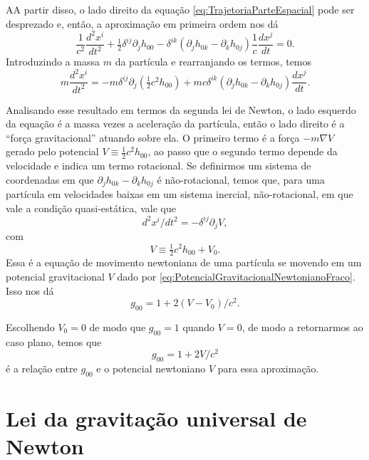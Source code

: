 AA partir disso, o lado direito da equação \eqref{eq:TrajetoriaParteEspacial} pode ser desprezado e, então, a aproximação em primeira ordem nos dá
\[
\frac{1}{c^{2}} \frac{d^{2} x^{i}}{d t^{2}}+\tfrac{1}{2} \delta^{i j} \partial_{j} h_{00}-\delta^{i k}\left(\partial_{j} h_{0 k}-\partial_{k} h_{0 j}\right) \frac{1}{c} \frac{d x^{j}}{d t}=0 .
\]
Introduzindo a massa $ m $ da partícula e rearranjando os termos, temos
\begin{equation}\label{eq:TrajetoriaParticulaComMassa}
m \frac{d^{2} x^{i}}{d t^{2}}=-m \delta^{i j} \partial_{j}\left(\tfrac{1}{2} c^{2} h_{00}\right)+m c \delta^{i k}\left(\partial_{j} h_{0 k}-\partial_{k} h_{0 j}\right) \frac{d x^{j}}{d t} .
\end{equation}

Analisando esse resultado em termos da segunda lei de Newton, o lado esquerdo da equação é a massa vezes a aceleração da partícula, então o lado direito é a ``força gravitacional'' atuando sobre ela. O primeiro termo é a força $ -m \nabla V $ gerado pelo potencial $ V \equiv \tfrac{1}{2} c^{2} h_{00} $, ao passo que o segundo termo depende da velocidade e indica um termo rotacional. Se definirmos um sistema de coordenadas em que $ \partial_{j} h_{0 k}-\partial_{k} h_{0 j} $ é não-rotacional, temos que, para uma partícula em velocidades baixas em um sistema inercial, não-rotacional, em que vale a condição quasi-estática, vale que
\begin{equation}\label{eq:EquacaoMovimentoPotencial}
d^{2} x^{i} / d t^{2}=-\delta^{i j} \partial_{j} V,
\end{equation}
com
\begin{equation}\label{eq:PotencialGravitacionalNewtonianoFraco}
V \equiv \tfrac{1}{2} c^{2} h_{00}+V_0.
\end{equation}
Essa é a equação de movimento newtoniana de uma partícula se movendo em um potencial gravitacional $ V $ dado por \eqref{eq:PotencialGravitacionalNewtonianoFraco}. Isso nos dá
\[
g_{00}=1+ 2(V-V_0) / c^{2}.
\]

Escolhendo $ V_0=0 $ de modo que $ g_{00} = 1 $ quando $ V=0 $, de modo a retornarmos ao caso plano, temos que
\begin{equation}\label{eq:RelacaoG00Potencial}
\boxed{
g_{00}=1+2 V / c^{2}}
\end{equation}
é a relação entre $ g_{00} $ e o potencial newtoniano $ V $ para essa aproximação.

\section{Lei da gravitação universal de Newton}\label{sec:GravitacaoNewton}

